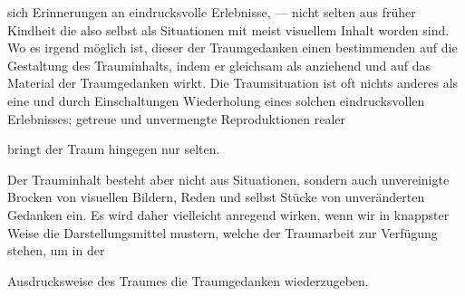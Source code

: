 \documentclass{article}
\begin{document}
        \pstart
        sich 
     Erinnerungen an eindrucksvolle Erlebnisse, — nicht selten aus früher
               Kindheit 
     die also selbst als Situationen mit meist visuellem Inhalt 
     worden sind. Wo es irgend möglich ist, 
     dieser 
     der Traumgedanken einen bestimmenden 
     auf die Gestaltung des Trauminhalts, indem er gleichsam als 
     anziehend und 
     auf das Material der Traumgedanken wirkt. Die Traumsituation
               ist oft nichts anderes als eine 
     und durch Einschaltungen 
     Wiederholung eines solchen eindrucksvollen Erlebnisses;
               getreue und unvermengte Reproduktionen realer
               
     bringt der Traum hingegen nur 
     selten.
        \pend
    
            
        \pstart
        Der Trauminhalt besteht aber nicht 
     aus Situationen, sondern 
     auch unvereinigte Brocken von visuellen Bildern, Reden und selbst Stücke
               von unveränderten Gedanken ein. Es wird daher vielleicht anregend wirken,
               wenn wir in knappster Weise die Darstellungsmittel mustern, welche der
               Traumarbeit zur Verfügung stehen, um in der
               
     Ausdrucksweise des Traumes die Traumgedanken wiederzugeben.
        \pend
    
\end{document}
